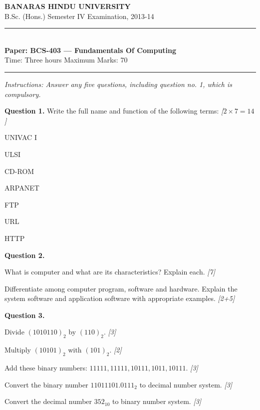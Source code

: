 \documentclass[11pt,a4paper]{article}
\newcommand{\pts}[1]{\hfill\textit{[#1]}}
\begin{document}
\begin{center}
  {\large\bfseries BANARAS HINDU UNIVERSITY}\\[2pt]
  {\normalsize B.Sc. (Hons.) Semester IV Examination, 2013-14}\\[6pt]
  \rule{0.8\linewidth}{0.5pt}\\[6pt]
  {\large\bfseries Paper: BCS-403 --- Fundamentals Of Computing}\\[4pt]
  {\normalsize Time: Three hours \hfill Maximum Marks: 70}
\end{center}

\rule{\linewidth}{0.4pt}

\smallskip
\noindent\textit{Instructions: Answer any five questions, including question no. 1, which is compulsory.}

\bigskip

\medskip\noindent\textbf{Question 1.} Write the full name and function of the following terms: \pts{$2\times7=14$}
\begin{parts}
  \item UNIVAC I
  \item ULSI
  \item CD-ROM
  \item ARPANET
  \item FTP
  \item URL
  \item HTTP
\end{parts}

\medskip\noindent\textbf{Question 2.}
\begin{parts}
  \item What is computer and what are its characteristics? Explain each. \pts{7}
  \item Differentiate among computer program, software and hardware. Explain the system software and application software with appropriate examples. \pts{2+5}
\end{parts}

\medskip\noindent\textbf{Question 3.}
\begin{parts}
  \item Divide $(1010110)_2$ by $(110)_2$. \pts{3}
  \item Multiply $(10101)_2$ with $(101)_2$. \pts{2}
  \item Add these binary numbers: $11111, 11111, 10111, 1011, 10111$. \pts{3}
  \item Convert the binary number $11011101.0111_2$ to decimal number system. \pts{3}
  \item Convert the decimal number $352_{10}$ to binary number system. \pts{3}
\end{parts}
\end{document}

